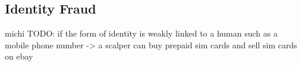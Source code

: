 \subsection{Identity Fraud}\label{subsection:identity-fraud}
michi
TODO: if the form of identity is weakly linked to a human such as a mobile phone number -> a scalper can buy prepaid sim cards and sell sim cards on ebay